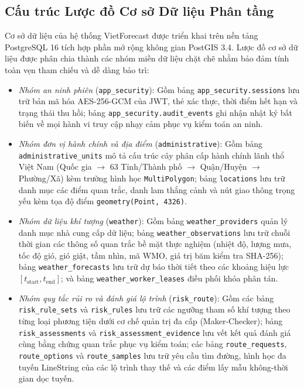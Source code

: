 \subsection{Cấu trúc Lược đồ Cơ sở Dữ liệu Phân tầng}
Cơ sở dữ liệu của hệ thống VietForecast được triển khai trên nền tảng PostgreSQL 16 tích hợp phần mở rộng không gian PostGIS 3.4. Lược đồ cơ sở dữ liệu được phân chia thành các nhóm miền dữ liệu chặt chẽ nhằm bảo đảm tính toàn vẹn tham chiếu và dễ dàng bảo trì:
\begin{itemize}
    \item[-] \textit{Nhóm an ninh phiên} (\texttt{app\_security}): Gồm bảng \texttt{app\_security.}\allowbreak\texttt{sessions} lưu trữ bản mã hóa AES-256-GCM của JWT, thẻ xác thực, thời điểm hết hạn và trạng thái thu hồi; bảng \texttt{app\_security.audit\_events} ghi nhận nhật ký bất biến về mọi hành vi truy cập nhạy cảm phục vụ kiểm toán an ninh.
    \item[-] \textit{Nhóm đơn vị hành chính và địa điểm} (\texttt{administrative}): Gồm bảng \texttt{administrative\_}\allowbreak\texttt{units} mô tả cấu trúc cây phân cấp hành chính lãnh thổ Việt Nam (Quốc gia $\rightarrow$ 63 Tỉnh/Thành phố $\rightarrow$ Quận/Huyện $\rightarrow$ Phường/Xã) kèm trường hình học \texttt{MultiPolygon}; bảng \texttt{locations} lưu trữ danh mục các điểm quan trắc, danh lam thắng cảnh và nút giao thông trọng yếu kèm tọa độ điểm \texttt{geometry(Point, 4326)}.
    \item[-] \textit{Nhóm dữ liệu khí tượng} (\texttt{weather}): Gồm bảng \texttt{weather\_providers} quản lý danh mục nhà cung cấp dữ liệu; bảng \texttt{weather\_observations} lưu trữ chuỗi thời gian các thông số quan trắc bề mặt thực nghiệm (nhiệt độ, lượng mưa, tốc độ gió, gió giật, tầm nhìn, mã WMO, giá trị băm kiểm tra SHA-256); bảng \texttt{weather\_forecasts} lưu trữ dự báo thời tiết theo các khoảng hiệu lực $[t_{\text{start}}, t_{\text{end}}]$; và bảng \texttt{weather\_worker\_leases} điều phối khóa phân tán.
    \item[-] \textit{Nhóm quy tắc rủi ro và đánh giá lộ trình} (\texttt{risk\_route}): Gồm các bảng \texttt{risk\_}\allowbreak\texttt{rule\_}\allowbreak\texttt{sets} và \texttt{risk\_}\allowbreak\texttt{rules} lưu trữ các ngưỡng tham số khí tượng theo từng loại phương tiện dưới cơ chế quản trị đa cấp (Maker-Checker); bảng \texttt{risk\_}\allowbreak\texttt{assessments} và \texttt{risk\_}\allowbreak\texttt{assessment\_}\allowbreak\texttt{evidence} lưu vết kết quả đánh giá cùng bằng chứng quan trắc phục vụ kiểm toán; các bảng \texttt{route\_}\allowbreak\texttt{requests}, \texttt{route\_}\allowbreak\texttt{options} và \texttt{route\_}\allowbreak\texttt{samples} lưu trữ yêu cầu tìm đường, hình học đa tuyến LineString của các lộ trình thay thế và các điểm lấy mẫu không-thời gian dọc tuyến.
\end{itemize}

